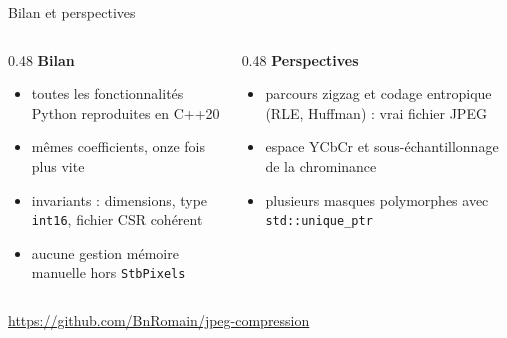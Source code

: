 \documentclass[aspectratio=169,10pt]{beamer}
\newcommand{\code}[1]{\texttt{#1}}
\begin{document}
\begin{frame}{Bilan et perspectives}
  \begin{columns}[T]
    \begin{column}{0.48\textwidth}
      \textbf{Bilan}
      \begin{itemize}
        \item toutes les fonctionnalités Python reproduites en C++20
        \item mêmes coefficients, onze fois plus vite
        \item invariants : dimensions, type \code{int16}, fichier CSR cohérent
        \item aucune gestion mémoire manuelle hors \code{StbPixels}
      \end{itemize}
    \end{column}
    \begin{column}{0.48\textwidth}
      \textbf{Perspectives}
      \begin{itemize}
        \item parcours zigzag et codage entropique (RLE, Huffman) : vrai fichier JPEG
        \item espace YCbCr et sous-échantillonnage de la chrominance
        \item plusieurs masques polymorphes avec \code{std::unique\_ptr}
      \end{itemize}
    \end{column}
  \end{columns}
  \vspace{1.2em}
  \centering
  \small \url{https://github.com/BnRomain/jpeg-compression}
\end{frame}
\end{document}
